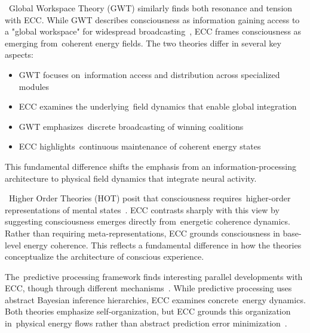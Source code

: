 \begin{refsection}
  ~Global Workspace Theory (GWT) similarly finds both resonance and tension with ECC. While GWT describes consciousness as information gaining access to a "global workspace" for widespread broadcasting~\cite{Baars2019, Dehaene2011}, ECC frames consciousness as emerging from~coherent energy fields. The two theories differ in several key aspects:
  \begin{itemize}
    \item GWT focuses on~information access and distribution across specialized modules
    \item ECC examines the underlying~field dynamics that enable global integration
    \item GWT emphasizes~discrete broadcasting of winning coalitions
    \item ECC highlights~continuous maintenance of coherent energy states
  \end{itemize}
  This fundamental difference shifts the emphasis from an information-processing architecture to physical field dynamics that integrate neural activity.

  ~Higher Order Theories (HOT) posit that consciousness requires~higher-order representations of mental states~\cite{Block2020, Rosenthal2019}. ECC contrasts sharply with this view by suggesting consciousness emerges directly from~energetic coherence dynamics. Rather than requiring meta-representations, ECC grounds consciousness in base-level energy coherence. This reflects a fundamental difference in how the theories conceptualize the architecture of conscious experience.

  The~predictive processing framework finds interesting parallel developments with ECC, though through different mechanisms~\cite{Clark2019, Seth2016}. While predictive processing uses abstract Bayesian inference hierarchies, ECC examines concrete~energy dynamics. Both theories emphasize self-organization, but ECC grounds this organization in~physical energy flows rather than abstract prediction error minimization~\cite{Friston2020}.


\end{refsection}
